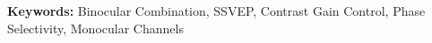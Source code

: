 \noindent\textbf{Keywords:} Binocular Combination, SSVEP, Contrast Gain Control, Phase Selectivity, Monocular Channels